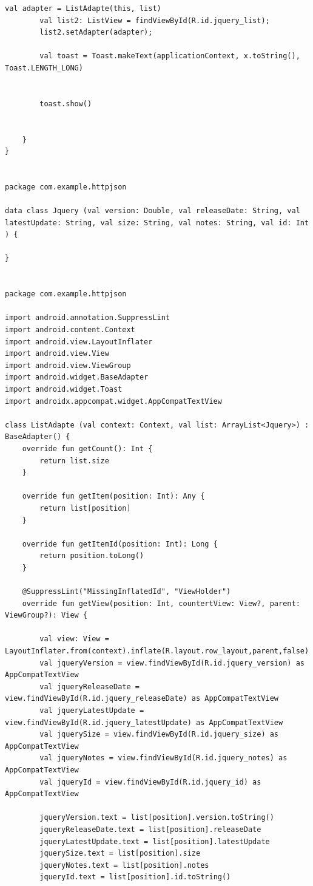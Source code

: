 \documentclass[a4paper, 14pt]{extarticle}
\begin{document}
\begin{lstlisting}[language={},caption={},label={lst:code1}]
        val adapter = ListAdapte(this, list)
        val list2: ListView = findViewById(R.id.jquery_list);
        list2.setAdapter(adapter);

        val toast = Toast.makeText(applicationContext, x.toString(), Toast.LENGTH_LONG)


        toast.show()


    }
}


package com.example.httpjson

data class Jquery (val version: Double, val releaseDate: String, val latestUpdate: String, val size: String, val notes: String, val id: Int ) {

}


package com.example.httpjson

import android.annotation.SuppressLint
import android.content.Context
import android.view.LayoutInflater
import android.view.View
import android.view.ViewGroup
import android.widget.BaseAdapter
import android.widget.Toast
import androidx.appcompat.widget.AppCompatTextView

class ListAdapte (val context: Context, val list: ArrayList<Jquery>) : BaseAdapter() {
    override fun getCount(): Int {
        return list.size
    }

    override fun getItem(position: Int): Any {
        return list[position]
    }

    override fun getItemId(position: Int): Long {
        return position.toLong()
    }

    @SuppressLint("MissingInflatedId", "ViewHolder")
    override fun getView(position: Int, countertView: View?, parent: ViewGroup?): View {

        val view: View = LayoutInflater.from(context).inflate(R.layout.row_layout,parent,false)
        val jqueryVersion = view.findViewById(R.id.jquery_version) as AppCompatTextView
        val jqueryReleaseDate = view.findViewById(R.id.jquery_releaseDate) as AppCompatTextView
        val jqueryLatestUpdate = view.findViewById(R.id.jquery_latestUpdate) as AppCompatTextView
        val jquerySize = view.findViewById(R.id.jquery_size) as AppCompatTextView
        val jqueryNotes = view.findViewById(R.id.jquery_notes) as AppCompatTextView
        val jqueryId = view.findViewById(R.id.jquery_id) as AppCompatTextView

        jqueryVersion.text = list[position].version.toString()
        jqueryReleaseDate.text = list[position].releaseDate
        jqueryLatestUpdate.text = list[position].latestUpdate
        jquerySize.text = list[position].size
        jqueryNotes.text = list[position].notes
        jqueryId.text = list[position].id.toString()


\end{lstlisting}
\end{document}
